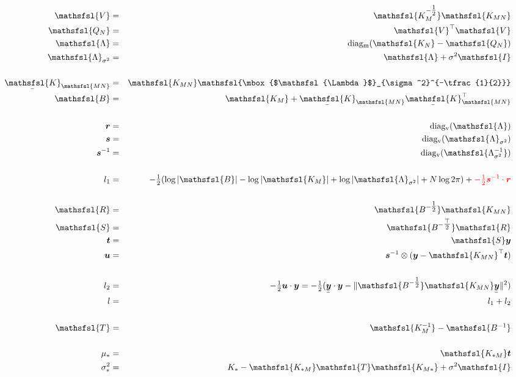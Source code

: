 \documentclass[12pt]{article}
\newcommand{\red}{\textcolor{red}}
\newcommand{\myu}[1]{\underaccent{\bar}{#1}}
\newcommand{\onehalf}{\tfrac{1}{2}}
\newcommand{\mat}[1]{\mbox{$\mathsfsl{#1}$}}
\newcommand{\myvec}[1]{\mbox{\boldmath$#1$}}
\newcommand{\diagv}[1]{\mathrm{diag_v}(#1)}
\newcommand{\diagm}[1]{\mathrm{diag_m}(#1)}
\newcommand{\transm}[1]{\mat{#1}^\top}
\newcommand{\imat}[1]{\mat{#1^{-1}}}
\newcommand{\ichol}[1]{\mat{#1^{-\onehalf}}}
\newcommand{\icholt}[1]{\mat{#1^{-\tfrac{\top}{2}}}}
\newcommand{\Km}{\mat{K_M}}
\newcommand{\Kmn}{\mat{K_{MN}}}
\newcommand{\Knm}{\transm{K_{MN}}}
\newcommand{\uKnm}{\myu{\mat{K}}_{\mathsfsl{MN}}^\top}
\newcommand{\uKmn}{\myu{\mat{K}}_{\mathsfsl{MN}}}
\newcommand{\vecr}{\myvec{r}}
\newcommand{\vecs}{\myvec{s}}
\newcommand{\vect}{\myvec{t}}
\newcommand{\vecu}{\myvec{u}}
\newcommand{\vecy}{\myvec{y}}
\newcommand{\uuvecy}{\myu{\myu{\vecy}}}
\newcommand{\vecis}{\myvec{s}^{-1}}
\newcommand{\matB}{\mat{B}}
\newcommand{\matI}{\mat{I}}
\newcommand{\matR}{\mat{R}}
\newcommand{\matS}{\mat{S}}
\newcommand{\matT}{\mat{T}}
\newcommand{\matV}{\mat{V}}
\newcommand{\Lam}{\mat{\Lambda}}
\newcommand{\Lamss}{\mat{\Lambda}_{\sigma^2}}
\newcommand{\Lamssi}{\imat{\Lambda_{\sigma^2}}}
\begin{document}
\begin{eqnarray*}
\matV & = & \ichol{K_M}\Kmn \\
\mat{Q_N} & = & \transm{V} \matV \\
\Lam & = & \diagm{\mat{K_N} - \mat{Q_N}} \\
\Lamss & = & \Lam + \sigma^2 \matI \\
\\
\uKmn & = & \Kmn \ichol{\Lamss} \\
\matB & = & \Km + \uKmn\uKnm \\
\\
\vecr & = & \diagv{\Lam} \\
\vecs & = & \diagv{\Lamss} \\
\vecis & = & \diagv{\Lamssi} \\
\\
l_1 & = & -\onehalf (\log|\matB| - \log|\Km| + \log|\Lamss| + N \log 2\pi) + \red{-\onehalf\vecis \cdot \vecr} \\
\\
\matR & = & \ichol{B}\Kmn \\
\matS & = & \icholt{B}\matR \\
\vect & = & \matS \vecy \\
\vecu & = & \vecis \otimes (\vecy - \Knm \vect) \\
\\
l_2 & = & -\onehalf \vecu\cdot\vecy = -\onehalf(\uuvecy\cdot\vecy - \|\ichol{B}\Kmn\uuvecy\|^2) \\
l & = & l_1 + l_2 \\
\\
\matT & = & \imat{K_M} - \imat{B} \\
\\
\mu_* & = & \mat{K_{*M}} \vect \\
\sigma^2_* & = & K_* - \mat{K_{*M}}\matT\mat{K_{M*}} + \sigma^2 \matI \\
\end{eqnarray*}
\end{document}
